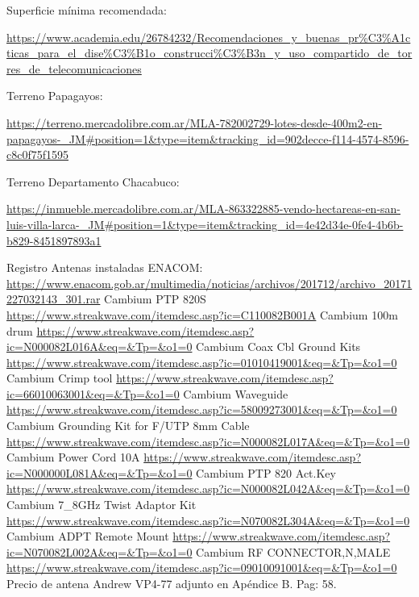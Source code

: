 \newpage


\begin{thebibliography}{99}
Superficie mínima recomendada: \begin{tiny}
\url{https://www.academia.edu/26784232/Recomendaciones_y_buenas_pr\%C3\%A1cticas_para_el_dise\%C3\%B1o_construcci\%C3\%B3n_y_uso_compartido_de_torres_de_telecomunicaciones}
\end{tiny}

Terreno Papagayos: \begin{tiny}
\url{https://terreno.mercadolibre.com.ar/MLA-782002729-lotes-desde-400m2-en-papagayos-_JM#position=1&type=item&tracking_id=902decce-f114-4574-8596-c8c0f75f1595}
\end{tiny}



Terreno Departamento Chacabuco:  \begin{tiny}
\url{https://inmueble.mercadolibre.com.ar/MLA-863322885-vendo-hectareas-en-san-luis-villa-larca-_JM#position=1&type=item&tracking_id=4e42d34e-0fe4-4b6b-b829-8451897893a1}
\end{tiny}


 Registro Antenas instaladas ENACOM: \url{https://www.enacom.gob.ar/multimedia/noticias/archivos/201712/archivo_20171227032143_301.rar}
Cambium PTP 820S \url{https://www.streakwave.com/itemdesc.asp?ic=C110082B001A}
Cambium 100m drum \url{https://www.streakwave.com/itemdesc.asp?ic=N000082L016A&eq=&Tp=&o1=0}
Cambium Coax Cbl Ground Kits \url{https://www.streakwave.com/itemdesc.asp?ic=01010419001&eq=&Tp=&o1=0}
Cambium Crimp tool \url{https://www.streakwave.com/itemdesc.asp?ic=66010063001&eq=&Tp=&o1=0}
Cambium Waveguide \url{https://www.streakwave.com/itemdesc.asp?ic=58009273001&eq=&Tp=&o1=0}
Cambium Grounding Kit for F/UTP 8mm Cable \url{https://www.streakwave.com/itemdesc.asp?ic=N000082L017A&eq=&Tp=&o1=0}
Cambium Power Cord 10A \url{https://www.streakwave.com/itemdesc.asp?ic=N000000L081A&eq=&Tp=&o1=0}
Cambium PTP 820 Act.Key \url{https://www.streakwave.com/itemdesc.asp?ic=N000082L042A&eq=&Tp=&o1=0}
Cambium 7\_8GHz Twist Adaptor Kit \url{https://www.streakwave.com/itemdesc.asp?ic=N070082L304A&eq=&Tp=&o1=0}
Cambium ADPT Remote Mount \url{https://www.streakwave.com/itemdesc.asp?ic=N070082L002A&eq=&Tp=&o1=0}
Cambium RF CONNECTOR,N,MALE \url{https://www.streakwave.com/itemdesc.asp?ic=09010091001&eq=&Tp=&o1=0}
Precio de antena Andrew VP4-77 adjunto en Apéndice B. Pag: 58. 
\end{thebibliography}

\newpage